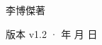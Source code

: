 \begin{titlepage}
\vfill
{\LARGE\sffamily 李博傑\quad 著\par}
\vspace{0.7cm}
{\small\sffamily\color{structurecolor!80} 版本 v1.2 · \number\year 年 \number\month 月 \number\day 日\par}
\vspace{1.2cm}
\end{titlepage}
